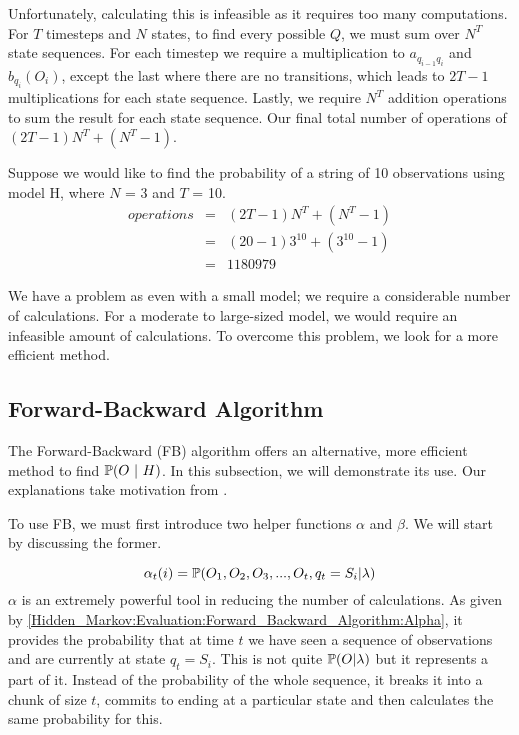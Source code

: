 Unfortunately, calculating this is infeasible as it requires too many computations. For $T$ timesteps and $N$ states, to find every possible $Q$, we must sum over $N^T$ state sequences. For each timestep we require a multiplication to $a_{q_{i-1}q_{i}}$ and $b_{q_i}(O_i)$, except the last where there are no transitions, which leads to $2T-1$ multiplications for each state sequence. Lastly, we require $N^T$ addition operations to sum the result for each state sequence. Our final total number of operations of $(2T-1)N^T + (N^T-1)$. 

\begin{example}
    \label{Hidden_Markov:Evaluation:motivfb}
    Suppose we would like to find the probability of a string of 10 observations using model H, where $N$ = 3 and $T$ = 10. 
    \begin{eqnarray}
        operations & = & (2T-1)N^T + (N^T-1) \\
                   & = & (20-1)3^10 + (3^10 -1) \\
                   & = & 1180979
    \end{eqnarray}
\end{example}


We have a problem as even with a small model; we require a considerable number of calculations. For a moderate to large-sized model, we would require an infeasible amount of calculations. To overcome this problem, we look for a more efficient method.



    \subsection{Forward-Backward Algorithm}
    \label{Hidden_Markov:Evaluation:Forward_Backward_Algorithm}

    The Forward-Backward (FB) algorithm offers an alternative, more efficient method to find $\prob (O \ | \ H)$. In this subsection, we will demonstrate its use. Our explanations take motivation from \cite{Rabiner1986}.

    To use FB, we must first introduce two helper functions $\alpha$ and $\beta$. We will start by discussing the former. 

    \begin{equation}
        \label{Hidden_Markov:Evaluation:Forward_Backward_Algorithm:Alpha}
        \alpha_t(i) = \mathbb{P} (O_1,O_2,O_3,...,O_t,q_t=S_i | \lambda)
    \end{equation}
    $\alpha$ is an extremely powerful tool in reducing the number of calculations. As given by \ref{Hidden_Markov:Evaluation:Forward_Backward_Algorithm:Alpha}, it provides the probability that at time $t$ we have seen a sequence of observations and are currently at state $q_t=S_i$. This is not quite $\mathbb{P} (O | \lambda)$ but it represents a part of it. Instead of the probability of the whole sequence, it breaks it into a chunk of size $t$, commits to ending at a particular state and then calculates the same probability for this.

